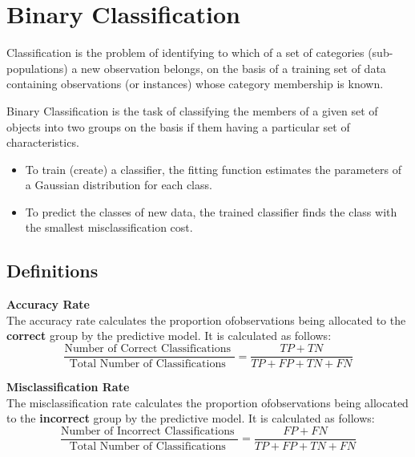 \documentclass[a4paper,12pt]{article}
\begin{document}
	\section*{Binary Classification}
Classification is the problem of identifying to which of a set of categories
(sub-populations) a new observation belongs, on the basis of a training set
of data containing observations (or instances) whose category membership is
known. 

Binary Classification is the task of classifying the members of a given set of objects into two groups on the basis
if them having a particular set of characteristics.



\begin{itemize}
	\item  To train (create) a classifier, the fitting function estimates the parameters
	of a Gaussian distribution for each class.
	\item  To predict the classes of new data, the trained classifier finds the class
	with the smallest misclassification cost.
\end{itemize}


	
	

	\subsection*{Definitions}
	\textbf{Accuracy Rate}\\
	The accuracy rate calculates the proportion ofobservations being allocated to the \textbf{correct} group by the predictive model. It is calculated as follows:
	\[ \frac{
		\mbox{Number of Correct Classifications }}{\mbox{Total Number of Classifications }}  = \frac{TP + TN}{TP+FP+TN+FN}\]
	
	
	\noindent \textbf{Misclassification Rate}\\
	The misclassification rate calculates the proportion ofobservations being allocated to the \textbf{incorrect} group by the predictive model. It is calculated as follows:
	\[ \frac{
		\mbox{Number of Incorrect Classifications }}{\mbox{Total Number of Classifications }}  = \frac{FP + FN}{TP+FP+TN+FN}\]

\end{document}
